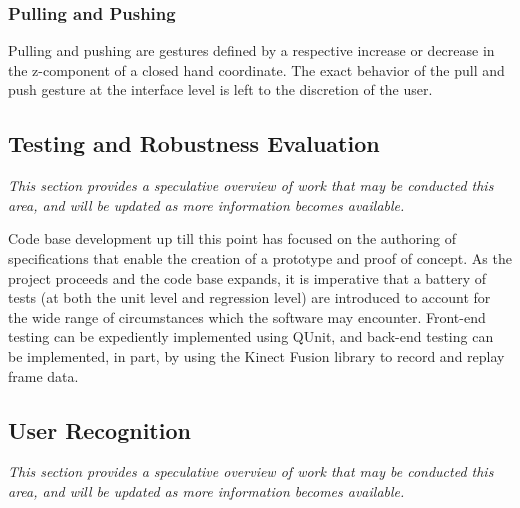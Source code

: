 \documentclass{scrartcl}
\numberwithin{equation}{section}
\begin{document}
      \subsubsection{Pulling and Pushing}
      Pulling and pushing are gestures defined by a respective increase or decrease in the z-component of a closed hand coordinate. The exact behavior of the pull and push gesture at the interface level is left to the discretion of the user.
    \subsection{Testing and Robustness Evaluation\label{sec:phase5}}
      \emph{This section provides a speculative overview of work that may be conducted this area, and will be updated as more information becomes available.}

      Code base development up till this point has focused on the authoring of specifications that enable the creation of a prototype and proof of concept. As the project proceeds and the code base expands, it is imperative that a battery of tests (at both the unit level and regression level) are introduced to account for the wide range of circumstances which the software may encounter. Front-end testing can be expediently implemented using QUnit, and back-end testing can be implemented, in part, by using the Kinect Fusion library to record and replay frame data.
    \subsection{User Recognition\label{sec:phase6}}
      \emph{This section provides a speculative overview of work that may be conducted this area, and will be updated as more information becomes available.}
\end{document}
